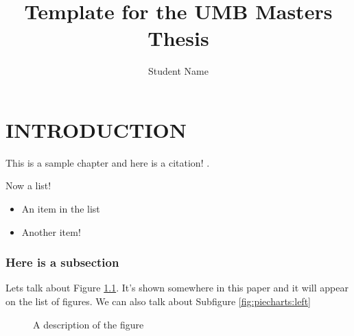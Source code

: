 \documentclass [MS] {umbthes}
\title          {Template for the UMB Masters Thesis}
\author         {Student Name}
\begin{document}
\makeintropages

%
%







\chapter{INTRODUCTION}

This is a sample chapter and here is a citation! \cite{cohen_genetically_2011}.

Now a list!

\begin{itemize}
\item An item in the list

\item Another item!
\end{itemize}


\subsection{Here is a subsection}

Lets talk about Figure \ref{fig:piecharts}. It's shown somewhere in this paper
and it will appear on the list of figures. We can also talk about Subfigure
\ref{fig:piecharts:left}

\begin{figure}[h]
\begin{center}

\caption{A description of the figure}
\label{fig:piecharts}
\end{center}
\end{figure} 
\end{document}
